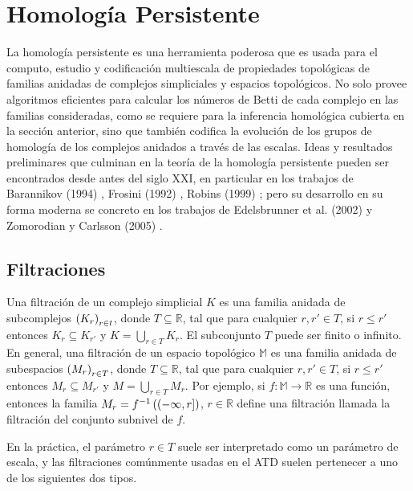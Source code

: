 \chapter{Homolog\'ia Persistente}

La homolog\'ia persistente es una herramienta poderosa que es usada para el computo, estudio y codificaci\'on
multiescala de propiedades topol\'ogicas de familias anidadas de complejos simpliciales y espacios
topol\'ogicos. No solo provee algoritmos eficientes para calcular los n\'umeros de Betti de cada complejo
en las familias consideradas, como se requiere para la inferencia homol\'ogica cubierta en la secci\'on
anterior, sino que tambi\'en codifica la evoluci\'on de los grupos de homolog\'ia de los
complejos anidados a trav\'es de las escalas. Ideas y resultados preliminares que culminan en la
teor\'ia de la homolog\'ia persistente pueden ser encontrados desde antes del siglo XXI, en particular
en los trabajos de Barannikov (1994) \cite{Barannikov1994}, Frosini (1992) \cite{Frosini1992},
Robins (1999) \cite{Robins1999}; pero su desarrollo en su forma moderna se concreto en los trabajos
de Edelsbrunner et al. (2002) \cite{Edelsbrunner2002} y Zomorodian y Carlsson (2005)
\cite{Zomorodian2005}.

\section{Filtraciones}

Una filtraci\'on de un complejo simplicial $K$ es una familia anidada de subcomplejos
$\left(K_{r}\right)_{r\in t}$, donde $T\subseteq\mathbb{R}$, tal que para cualquier
$r, r' \in T$, si $r\leq r'$ entonces $K_{r}\subseteq K_{r'}$ y $K = \bigcup_{r\in T}K_{r}$.
El subconjunto $T$ puede ser finito o infinito. En general, una filtraci\'on de un espacio
topol\'ogico $\mathbb{M}$ es una familia anidada de subespacios $\left(M_{r}\right)_{r\in T}$,
donde $T\subseteq\mathbb{R}$, tal que para cualquier $r, r' \in T$,
si $r\leq r'$ entonces $M_{r}\subseteq M_{r'}$ y $M = \bigcup_{r\in T}M_{r}$. Por ejemplo, si
$f: \mathbb{M}\rightarrow\mathbb{R}$ es una funci\'on, entonces la familia
$M_{r} = f^{-1}\left(\left(-\infty, r\right]\right)$, $r\in\mathbb{R}$ define una filtraci\'on llamada la
filtraci\'on del conjunto subnivel de $f$.

En la pr\'actica, el par\'ametro $r\in T$ suele ser interpretado como un par\'ametro de escala, y las
filtraciones com\'unmente usadas en el ATD suelen pertenecer a uno de los siguientes dos tipos.

